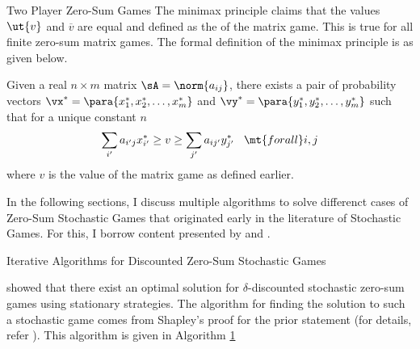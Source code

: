 \documentclass{article}
\begin{document}
\begin{psection}{Two Player Zero-Sum Games}
	The minimax principle claims that the values $\ut{v}$ and $\overline{v}$ are equal and defined as the  of the matrix game. This is true for all finite zero-sum matrix games. The formal definition of the minimax principle is as given below.

	\begin{theorem}
		Given a real $n \times m$ matrix $\sA = \norm{a_{ij}}$, there exists a pair of probability vectors $\vx^\ast = \para{x_1^\ast, x_2^\ast, \dots, x_m^\ast}$ and $\vy^\ast = \para{y_1^\ast, y_2^\ast, \dots, y_m^\ast}$ such that for a unique constant $n$
		\begin{align}
			\sum_{i'} a_{i'j} x_{i'}^\ast \ge v \ge \sum_{j'} a_{ij'} y_{j'}^\ast \hspace{3mm} \mt{for all} i,j
			\label{eq:minimax}
		\end{align}
		where $v$ is the value of the matrix game as defined earlier.
		\label{th:minimax}
	\end{theorem}

	In the following sections, I discuss multiple algorithms to solve differenct cases of Zero-Sum Stochastic Games that originated early in the literature of Stochastic Games. For this, I borrow content presented by \cite{survey} and \cite{rl}.

	\begin{psubsection}{Iterative Algorithms for Discounted Zero-Sum Stochastic Games}


		\cite{shapley} showed that there exist an optimal solution for $\delta$-discounted stochastic zero-sum games using stationary strategies. The algorithm for finding the solution to such a stochastic game comes from Shapley's proof for the prior statement (for details, refer \citep{shapley}). This algorithm is given in Algorithm \hyperlink{algo:1}{1}


\end{psubsection}
\end{psection}
\end{document}
